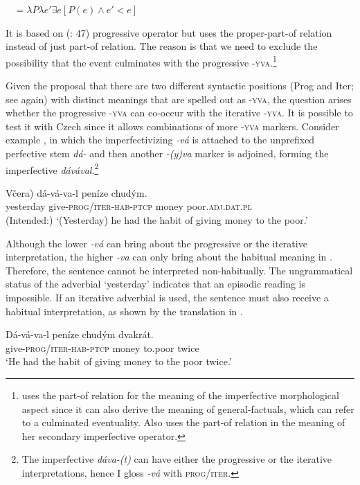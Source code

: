 \documentclass[output=paper,colorlinks,citecolor=brown]{langscibook}
\begin{document}
\ea\label{biskup:ex:prog}\
 $= \lambda P \lambda e' \exists e [P(e) \wedge e' < e]$
\z

\noindent It is based on \citeauthor{Krifka1992} (\citeyear{Krifka1992}: 47) progressive operator but uses the proper-part-of relation instead of just part-of relation. The reason is that we need to exclude the possibility that the event culminates with the progressive \textsc{-yva}.\footnote{\citet{Filip2005} uses the part-of relation for the meaning of the imperfective morphological aspect since it can also derive the meaning of general-factuals, which can refer to a culminated eventuality. Also \citet{bis:Lazorczyk2010} uses the part-of relation in the meaning of her secondary imperfective operator.}

Given the proposal that there are two different syntactic positions (Prog and Iter; see  again) with distinct meanings that are spelled out as \textsc{-yva}, the question arises whether the progressive \textsc{-yva} can co-occur with the iterative \textsc{-yva}. It is possible to test it with Czech since it allows combinations of more \textsc{-yva} markers. Consider example , in which the imperfectivizing \textit{-vá} is attached to the unprefixed perfective stem \textit{dá-} and then another \textit{-(y)va} marker is adjoined, forming the imperfective \textit{dávával}.\footnote{The imperfective \textit{dáva-(t)} can have either the progressive or the iterative interpretations, hence I gloss \textit{-vá} with \textsc{prog/iter}.}

\ea\label{biskup:ex:davaval}\gll \minsp{(*} Včera) dá-vá-va-l peníze chudým.\\
{} yesterday 	give-\textsc{prog/iter-hab-ptcp} money poor.\textsc{adj.dat.pl}\\
\glt (Intended:) ‘(Yesterday) he had the habit of giving money to the poor.’\\
\z

\noindent Although the lower \textit{-vá} can bring about the progressive or the iterative interpretation, the higher \textit{-va} can only bring about the habitual meaning in . Therefore, the sentence cannot be interpreted non-habitually. The ungrammatical status of the adverbial ‘yesterday’ indicates that an episodic reading is impossible. If an iterative adverbial is used, the sentence must also receive a habitual interpretation, as shown by the translation in .

\ea\label{biskup:ex:davavalhab}\gll Dá-vá-va-l peníze chudým dvakrát.\\
give-\textsc{prog/iter-hab-ptcp} money to.poor twice\\
\glt ‘He had the habit of giving money to the poor twice.’\\
\z
\end{document}
